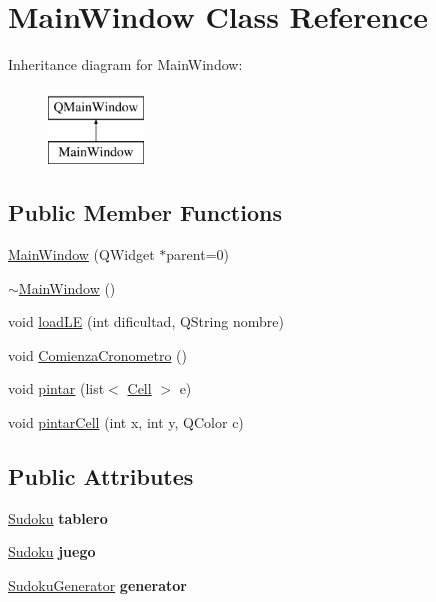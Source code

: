 \hypertarget{class_main_window}{\section{Main\-Window Class Reference}
\label{class_main_window}
}
Inheritance diagram for Main\-Window\-:\begin{figure}[H]
\begin{center}
\leavevmode
\includegraphics[height=2.000000cm]{class_main_window}
\end{center}
\end{figure}
\subsection*{Public Member Functions}
\begin{DoxyCompactItemize}
\item 
\hyperlink{class_main_window_a8b244be8b7b7db1b08de2a2acb9409db}{Main\-Window} (Q\-Widget $\ast$parent=0)
\item 
\hyperlink{class_main_window_ae98d00a93bc118200eeef9f9bba1dba7}{$\sim$\-Main\-Window} ()
\item 
void \hyperlink{class_main_window_a6f7ff976be1a9adfa19b23867f9c6d41}{load\-L\-E} (int dificultad, Q\-String nombre)
\item 
void \hyperlink{class_main_window_ab98df46367b9911377d5a85a293ae45f}{Comienza\-Cronometro} ()
\item 
void \hyperlink{class_main_window_a60f775aea4d2d76a37034f9659da20ff}{pintar} (list$<$ \hyperlink{class_cell}{Cell} $>$ e)
\item 
void \hyperlink{class_main_window_a4bba8622e7fca1f85bbb18e1eee37d71}{pintar\-Cell} (int x, int y, Q\-Color c)
\end{DoxyCompactItemize}
\subsection*{Public Attributes}
\begin{DoxyCompactItemize}
\item 
\hypertarget{class_main_window_a3584521b6f79321999e1c1613d5deedb}{\hyperlink{class_sudoku}{Sudoku} {\bfseries tablero}}\label{class_main_window_a3584521b6f79321999e1c1613d5deedb}

\item 
\hypertarget{class_main_window_ab06c0abc0234fe04c3d6720dd4bd71c2}{\hyperlink{class_sudoku}{Sudoku} {\bfseries juego}}\label{class_main_window_ab06c0abc0234fe04c3d6720dd4bd71c2}

\item 
\hypertarget{class_main_window_a5f9f0c071c52ca968564c2dc0210cf32}{\hyperlink{class_sudoku_generator}{Sudoku\-Generator} {\bfseries generator}}\label{class_main_window_a5f9f0c071c52ca968564c2dc0210cf32}

\end{DoxyCompactItemize}


